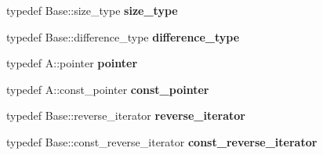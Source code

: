 \begin{DoxyCompactItemize}
\item 
\hypertarget{classLoki_1_1AssocVector_a2625a75f873c3f2cbdc1fde6e39a4a52}{}typedef Base\+::size\+\_\+type {\bfseries size\+\_\+type}\label{classLoki_1_1AssocVector_a2625a75f873c3f2cbdc1fde6e39a4a52}

\item 
\hypertarget{classLoki_1_1AssocVector_adcbfef8160453b3c427a7e15965d27ef}{}typedef Base\+::difference\+\_\+type {\bfseries difference\+\_\+type}\label{classLoki_1_1AssocVector_adcbfef8160453b3c427a7e15965d27ef}

\item 
\hypertarget{classLoki_1_1AssocVector_a14bfb76149adb2eeee8277f83774faf5}{}typedef A\+::pointer {\bfseries pointer}\label{classLoki_1_1AssocVector_a14bfb76149adb2eeee8277f83774faf5}

\item 
\hypertarget{classLoki_1_1AssocVector_ab8240cfa2f587d26066e1ab8c0b266dd}{}typedef A\+::const\+\_\+pointer {\bfseries const\+\_\+pointer}\label{classLoki_1_1AssocVector_ab8240cfa2f587d26066e1ab8c0b266dd}

\item 
\hypertarget{classLoki_1_1AssocVector_a703dc3f35f8eff11d1f995dd0e75e9d3}{}typedef Base\+::reverse\+\_\+iterator {\bfseries reverse\+\_\+iterator}\label{classLoki_1_1AssocVector_a703dc3f35f8eff11d1f995dd0e75e9d3}

\item 
\hypertarget{classLoki_1_1AssocVector_aea82be0e8352a98b6f54d0dd8030dbdb}{}typedef Base\+::const\+\_\+reverse\+\_\+iterator {\bfseries const\+\_\+reverse\+\_\+iterator}\label{classLoki_1_1AssocVector_aea82be0e8352a98b6f54d0dd8030dbdb}

\end{DoxyCompactItemize}
